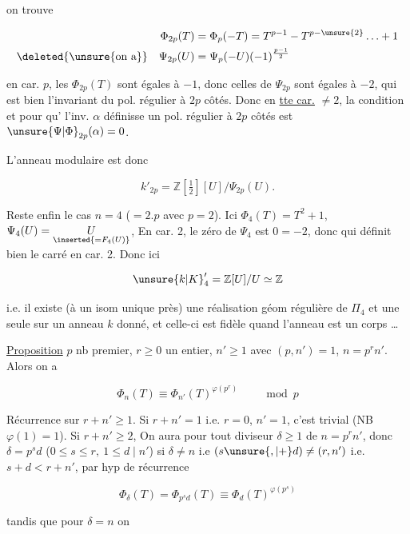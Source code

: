 
on trouve

\[
\begin{aligned}
\Phi_{2p}(T)&=\Phi_p(-T)=T^{p-1}-T^{p-\unsure{2}}\ldots+1\\
\deleted{\unsure{\text{on a}}}\quad\Psi_{2p}(U)&=\Psi_p(-U)(-1)^{\frac{p-1}{2}}
\end{aligned}
\]

en car. $p$, les    $\Phi_{2p}(T)$ sont égales à $-1$, donc celles de $\Psi_{2p}$ sont égales à $-2$, qui est bien l'invariant du pol. régulier à $2p$ côtés. Donc en \uline{tte car.} $\ne 2$, la condition  et  pour qu' l'inv. $\alpha$ définisse un pol. régulier à $2p$ côtés est $\unsure{\Psi|\Phi}_{2p}(\alpha)=0$.

L'anneau modulaire est donc

\[
k'_{2p}=\mathbb Z[\tfrac12][U]/\Psi_{2p}(U).
\]

Reste enfin le cas $n=4$ ($=2.p$ avec $p=2$). Ici $\Phi_4(T)=T^2+1$, $\Psi_4(U)=\underset{\inserted{=F_4(U)}}{U}$, En car. 2, le  zéro de $\Psi_4$ est $0=-2$, donc qui définit bien le carré en car. 2. Donc ici

\[
{\unsure{k|K}}'_4=\mathbb Z[U]/U\simeq\mathbb Z
\]

i.e. il existe (à un isom unique près) une réalisation géom régulière de $\Pi_4$ et une seule sur un anneau $k$ donné, et celle-ci est  fidèle quand l'anneau est un corps \ldots



\uline{Proposition}  $p$ nb premier, $r\geq 0$ un entier, $n'\geq 1$ avec $(p,n')=1$, $n=p^rn'$. Alors on a

\[
\Phi_n(T)\equiv\Phi_{n'}(T)^{\varphi(p^r)}\qquad\bmod p
\]

Récurrence sur $r+n'\geq1$. Si $r+n'=1$ i.e. $r=0$, $n'=1$, c'est trivial (NB $\varphi(1)=1$). Si $r+n'\geq2$, On aura pour tout diviseur $\delta\geq1$ de $n=p^rn'$, donc $\delta=p^sd$ ($0\leq s\leq r,\ 1\leq d\mid n'$) si $\delta\ne n$ i.e $(s\unsure{,|+}d)\ne(r,n')$ i.e. $s+d<r+n'$, par hyp de récurrence

\[
\Phi_\delta(T)=\Phi_{p^sd}(T)\equiv\Phi_d(T)^{\varphi(p^s)}\tag*{(1)}
\]

tandis que pour $\delta=n$ on 

